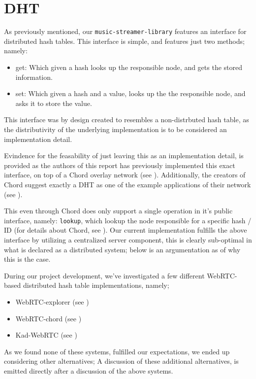 \section{\acs{DHT}}
\label{sec:dht}

As previously mentioned, our \verb|music-streamer-library| features an
interface for distributed hash tables. This interface is simple, and features
just two methods; namely:
\begin{itemize}
    \item get: Which given a hash looks up the responsible node, and gets the 
        stored information.
    \item set: Which given a hash and a value, looks up the the responsible
        node, and asks it to store the value.
\end{itemize}
This interface was by design created to resembles a non-distrbuted hash table,
as the distributivity of the underlying implementation is to be considered an 
implementation detail.

Evindence for the feasability of just leaving this as an implementation detail,
is provided as the authors of this report has previously implemented this exact
interface, on top of a Chord overlay network (see \citep{Skeen:Chord}).
Additionally, the creators of Chord suggest exactly a \acs{DHT} as one of the example
applications of their network (see \citep{Brunskill:Chord}).

This even through Chord does only support a single operation in it's public 
interface, namely: \verb|lookup|, which lookup the node responsible for a
specific hash / ID (for details about Chord, see \citep{Stoica:Chord}).
\newline\newline
Our current implementation fulfills the above interface by utilizing a
centralized server component, this is clearly sub-optimal in what is declared
as a distributed system; below is an argumentation as of why this is the case.

During our project development, we've investigated a few different WebRTC-based
distributed hash table implementations, namely;
\begin{itemize}
    \item WebRTC-explorer (see \citep{diasdavid:webrtc-explorer})
    \item WebRTC-chord (see \citep{diasdavid:webrtc-chord})
    \item Kad-WebRTC (see \citep{kadtools:kad-webrtc})
\end{itemize}
As we found none of these systems, fulfilled our expectations, we ended up 
considering other alternatives; A discussion of these additional alternatives,
is emitted directly after a discussion of the above systems.

